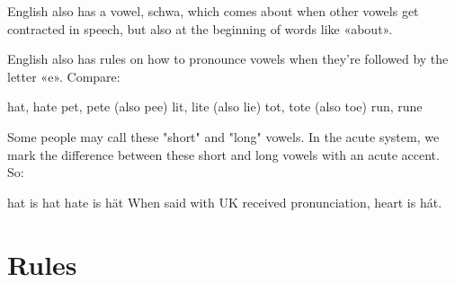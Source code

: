 \documentclass{article}
\begin{document}
English also has a vowel, schwa, which comes about when other vowels get
contracted in speech, but also at the beginning of words like «about».


English also has rules on how to pronounce vowels when they're followed by the
letter «e». Compare:

hat, hate
pet, pete (also pee)
lit, lite (also lie)
tot, tote (also toe)
run, rune

Some people may call these "short" and "long" vowels. In the acute system, we
mark the difference between these short and long vowels with an acute accent.
So:

hat is hat
hate is hät
When said with UK received pronunciation, heart is hát.

\section{Rules}
\end{document}
